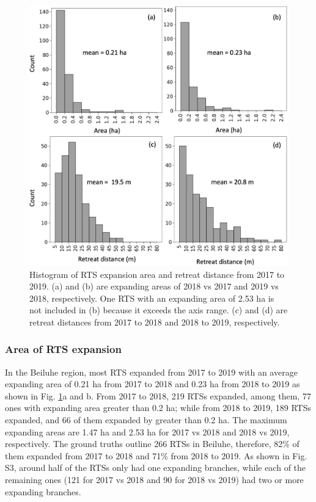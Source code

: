\documentclass[authoryear,preprint,review,12pt]{elsarticle}
\begin{document}
\begin{figure} 
	\centering
	\includegraphics[width=14cm]{figs/rts_change_area_dis_manu_trim.jpg}
	\caption{Histogram of RTS expansion area and retreat distance from 2017 to 2019. (a) and (b) are expanding areas of 2018 vs 2017 and 2019 vs 2018, respectively. One RTS with an expanding area of 2.53 ha is not included in (b) because it exceeds the axis range. (c) and (d) are retreat distances from 2017 to 2018 and 2018 to 2019, respectively.}
	\label{fig_rts_change_area_reDis}
\end{figure}

\subsubsection{Area of RTS expansion}
\label{sec_rts_change_area}


In the Beiluhe region, most RTS expanded from 2017 to 2019 with an average expanding area of 0.21 ha from 2017 to 2018 and 0.23 ha from 2018 to 2019 as shown in Fig. \ref{fig_rts_change_area_reDis}a and b.
From 2017 to 2018, 219 RTSs expanded, among them, 77 ones with expanding area greater than 0.2 ha; while from 2018 to 2019, 189 RTSs expanded, and 66 of them expanded by greater than 0.2 ha.
The maximum expanding areas are 1.47 ha and 2.53 ha for 2017 vs 2018 and 2018 vs 2019, respectively. 
The ground truths outline 266 RTSs in Beiluhe, therefore, 82\% of them expanded from 2017 to 2018 and 71\% from 2018 to 2019. 
As shown in Fig. S3, around half of the RTSs only had one expanding branches, while each of the remaining ones (121 for 2017 vs 2018 and 90 for 2018 vs 2019)  had two or more expanding branches. 
\end{document}
